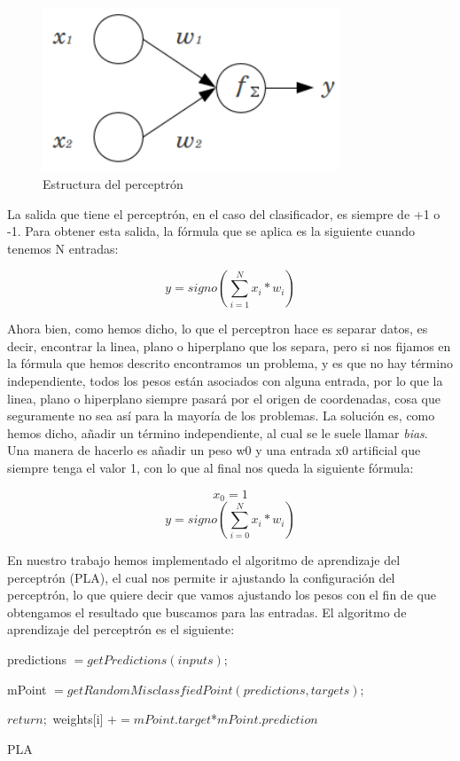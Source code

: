 \begin{figure}[h]
	\centering
	\includegraphics[width=0.79\textwidth]{Figures/perceptron}
	\caption{Estructura del perceptrón}
	\label{fig:perceptron}
\end{figure}

La salida que tiene el perceptrón, en el caso del clasificador, es siempre de +1 o -1. Para obtener esta salida, la fórmula que se aplica es la siguiente cuando tenemos N entradas:

\[y=signo(\sum_{i=1}^{N}x_{i}*w_{i})\]

Ahora bien, como hemos dicho, lo que el perceptron hace es separar datos, es decir, encontrar la linea, plano o hiperplano que los separa, pero si nos fijamos en la fórmula que hemos descrito encontramos un problema, y es que no hay término independiente, todos los pesos están asociados con alguna entrada, por lo que la linea, plano o hiperplano siempre pasará por el origen de coordenadas, cosa que seguramente no sea así para la mayoría de los problemas. La solución es, como hemos dicho, añadir un término independiente, al cual se le suele llamar \textit{bias}. Una manera de hacerlo es añadir un peso w0 y una entrada x0 artificial que siempre tenga el valor 1, con lo que al final nos queda la siguiente fórmula:

\[x_0=1\]
\[y=signo(\sum_{i=0}^{N}x_{i}*w_{i})\]

En nuestro trabajo hemos implementado el algoritmo de aprendizaje del perceptrón (PLA), el cual nos permite ir ajustando la configuración del perceptrón, lo que quiere decir que vamos ajustando los pesos con el fin de que obtengamos el resultado que buscamos para las entradas. El algoritmo de aprendizaje del perceptrón es el siguiente:

\vspace{2mm}
\begin{algorithm}[H]
    predictions $= getPredictions(inputs);$
    
    mPoint $= getRandomMisclassfiedPoint(predictions, targets);$
    
    {
		$return;$
	}
	{
        {
            weights[i] $+= mPoint.target$*$mPoint.prediction$
        }
	}
	\caption{PLA}
	\label{alg:pla}
\end{algorithm}
\vspace{2mm}


